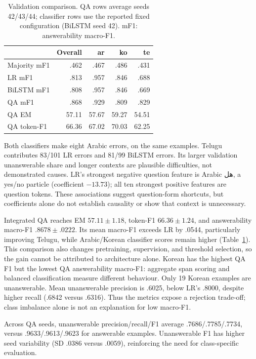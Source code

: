 \documentclass[11pt]{article}
\newcommand{\AR}[1]{{\arabicfont\beginR #1\endR}}
\begin{document}
\begin{table}[t]
\centering\small
\begin{tabular}{lrrrr}
\toprule
& Overall & ar & ko & te\\
\midrule
Majority mF1 & .462 & .467 & .486 & .431\\
LR mF1 & .813 & .957 & .846 & .688\\
BiLSTM mF1 & .808 & .957 & .846 & .669\\
QA mF1 & .868 & .929 & .809 & .829\\
QA EM & 57.11 & 57.67 & 59.27 & 54.51\\
QA token-F1 & 66.36 & 67.02 & 70.03 & 62.25\\
\bottomrule
\end{tabular}
\caption{Validation comparison. QA rows average seeds 42/43/44; classifier rows use the reported fixed configuration (BiLSTM seed 42). mF1: answerability macro-F1.}
\label{tab:results}
\end{table}

Both classifiers make eight Arabic errors, on the same examples. Telugu contributes 83/101 LR errors and 81/99 BiLSTM errors. Its larger validation unanswerable share and longer contexts are plausible difficulties, not demonstrated causes. LR's strongest negative question feature is Arabic \AR{هل}, a yes/no particle (coefficient $-13.73$); all ten strongest positive features are question tokens. These associations suggest question-form shortcuts, but coefficients alone do not establish causality or show that context is unnecessary.

Integrated QA reaches EM $57.11\pm1.18$, token-F1 $66.36\pm1.24$, and answerability macro-F1 $.8678\pm.0222$. Its mean macro-F1 exceeds LR by .0544, particularly improving Telugu, while Arabic/Korean classifier scores remain higher (Table~\ref{tab:results}). This comparison also changes pretraining, supervision, and threshold selection, so the gain cannot be attributed to architecture alone. Korean has the highest QA F1 but the lowest QA answerability macro-F1: aggregate span scoring and balanced classification measure different behaviour. Only 19 Korean examples are unanswerable. Mean unanswerable precision is .6025, below LR's .8000, despite higher recall (.6842 versus .6316). Thus the metrics expose a rejection trade-off; class imbalance alone is not an explanation for low macro-F1.

Across QA seeds, unanswerable precision/recall/F1 average .7686/.7785/.7734, versus .9633/.9613/.9623 for answerable examples. Unanswerable F1 has higher seed variability (SD .0386 versus .0059), reinforcing the need for class-specific evaluation.
\end{document}
